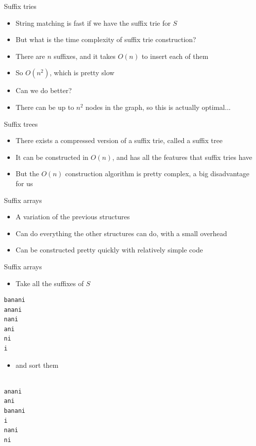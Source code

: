\documentclass{beamer}
\begin{document}
\begin{frame}{Suffix tries}
    \begin{itemize}
        \item String matching is fast if we have the suffix trie for $S$
            \vspace{10pt}
        \item But what is the time complexity of suffix trie construction?
        \item There are $n$ suffixes, and it takes $O(n)$ to insert each of them
        \item So $O(n^2)$, which is pretty slow
            \vspace{10pt}
        \item Can we do better?
        \item There can be up to $n^2$ nodes in the graph, so this is actually optimal...
    \end{itemize}
\end{frame}

\begin{frame}{Suffix trees}
    \begin{itemize}
        \item There exists a compressed version of a suffix trie, called a suffix tree
        \vspace{10pt}
    \item It can be constructed in $O(n)$, and has all the features that suffix tries have
    \item But the $O(n)$ construction algorithm is pretty complex, a big disadvantage for us
    \end{itemize}
\end{frame}

\begin{frame}{Suffix arrays}
    \begin{itemize}
        \item A variation of the previous structures
        \item Can do everything the other structures can do, with a small overhead
        \item Can be constructed pretty quickly with relatively simple code
    \end{itemize}
\end{frame}

\begin{frame}[fragile]{Suffix arrays}
    \begin{itemize}
        \item Take all the suffixes of $S$
    \end{itemize}
    \begin{verbatim}
banani
anani
nani
ani
ni
i

    \end{verbatim}
    \begin{itemize}
        \item and sort them
    \end{itemize}
    \begin{verbatim}

anani
ani
banani
i
nani
ni
    \end{verbatim}

\end{frame}
\end{document}
